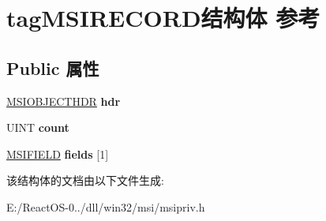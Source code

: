 \hypertarget{structtag_m_s_i_r_e_c_o_r_d}{}\section{tag\+M\+S\+I\+R\+E\+C\+O\+R\+D结构体 参考}
\label{structtag_m_s_i_r_e_c_o_r_d}
\subsection*{Public 属性}
\begin{DoxyCompactItemize}
\item 
\mbox{\label{structtag_m_s_i_r_e_c_o_r_d_ac5711fd723bf1370afcda4d6d60a3c60}} 
\hyperlink{structtag_m_s_i_o_b_j_e_c_t_h_d_r}{M\+S\+I\+O\+B\+J\+E\+C\+T\+H\+DR} {\bfseries hdr}
\item 
\mbox{\label{structtag_m_s_i_r_e_c_o_r_d_ad3ecd26d4737662352ca16796d36e0af}} 
U\+I\+NT {\bfseries count}
\item 
\mbox{\label{structtag_m_s_i_r_e_c_o_r_d_a84963e36a0c1f5f63269c3a12f96c91e}} 
\hyperlink{structtag_m_s_i_f_i_e_l_d}{M\+S\+I\+F\+I\+E\+LD} {\bfseries fields} \mbox{[}1\mbox{]}
\end{DoxyCompactItemize}


该结构体的文档由以下文件生成\+:\begin{DoxyCompactItemize}
\item 
E\+:/\+React\+O\+S-\/0../dll/win32/msi/msipriv.\+h\end{DoxyCompactItemize}
